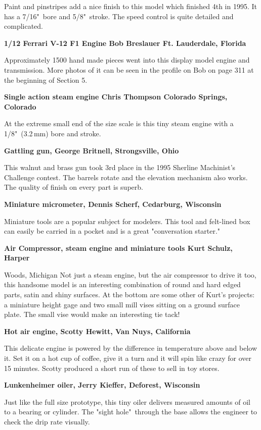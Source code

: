 Paint and pinstripes add a nice finish to this model which finished 4th in 1995.
It has a 7/16"\ bore and 5/8"\ stroke. The speed control is quite detailed and
complicated.

\bigskip\textbf{1/12 Ferrari V-12 F1 Engine
Bob Breslauer
Ft. Lauderdale, Florida}

Approximately 1500 hand made pieces went into this display model engine and
transmission. More photos of it can be seen in the profile on Bob on page 311 at
the beginning of Section 5.

\bigskip
\textbf{Single action steam engine
Chris Thompson
Colorado Springs, Colorado}

At the extreme small end of the size scale is this tiny steam engine with a
1/8"\ (3.2\,mm) bore and stroke.

\bigskip
\textbf{Gattling gun, George Britnell, Strongsville, Ohio}

This walnut and brass gun took 3rd place in the 1995 Sherline Machinist's
Challenge contest. The barrels rotate and the elevation mechanism also works.
The quality of finish on every part is superb.

\bigskip
\textbf{Miniature micrometer, Dennis Scherf, Cedarburg, Wisconsin}

Miniature tools are a popular subject for modelers. This tool and felt-lined box
can easily be carried in a pocket and is a great "conversation starter."

\bigskip
\textbf{Air Compressor, steam engine and miniature tools Kurt Schulz, Harper}

Woods, Michigan Not just a steam engine, but the air compressor to drive it too,
this handsome model is an interesting combination of round and hard edged parts,
satin and shiny surfaces. At the bottom are some other of Kurt's projects: a
miniature height gage and two small mill vises sitting on a ground surface
plate. The small vise would make an interesting tie tack!

\bigskip
\textbf{Hot air engine, Scotty Hewitt, Van Nuys, California}

This delicate engine is powered by the difference in temperature above and below
it. Set it on a hot cup of coffee, give it a turn and it will spin like crazy
for over 15 minutes. Scotty produced a short run of these to sell in toy stores.

\bigskip
\textbf{Lunkenheimer oiler, Jerry Kieffer, Deforest, Wisconsin}

Just like the full size prototype, this tiny oiler delivers measured amounts of
oil to a bearing or cylinder. The "sight hole"\ through the base allows the
engineer to check the drip rate visually.

